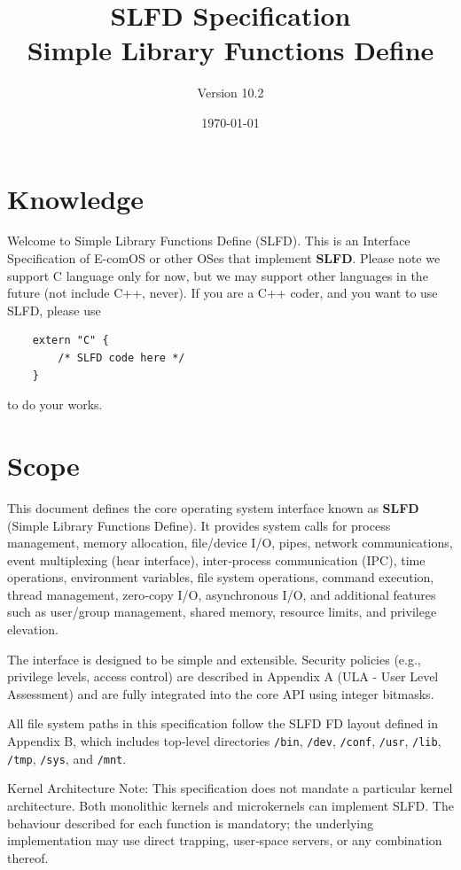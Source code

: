 \documentclass[12pt,a4paper]{article}
\title{SLFD Specification\\\large{Simple Library Functions Define}}
\author{Version 10.2}
\date{\today}
\begin{document}
\maketitle


\section{Knowledge}
Welcome to Simple Library Functions Define (SLFD). 
This is an Interface Specification of E-comOS or other OSes that implement \textbf{SLFD}.
Please note we support C language only for now, but we may support other languages in the future (not include C++, never).
If you are a C++ coder, and you want to use SLFD, please use 
\begin{lstlisting}
    extern "C" {
        /* SLFD code here */
    }
\end{lstlisting}
to do your works.

\section{Scope}
This document defines the core operating system interface known as \textbf{SLFD} (Simple Library Functions Define). It provides system calls for process management, memory allocation, file/device I/O, pipes, network communications, event multiplexing (hear interface), inter‑process communication (IPC), time operations, environment variables, file system operations, command execution, thread management, zero‑copy I/O, asynchronous I/O, and additional features such as user/group management, shared memory, resource limits, and privilege elevation.

The interface is designed to be simple and extensible. Security policies (e.g., privilege levels, access control) are described in Appendix A (ULA - User Level Assessment) and are fully integrated into the core API using integer bitmasks.

All file system paths in this specification follow the SLFD FD layout defined in Appendix B, which includes top‑level directories \texttt{/bin}, \texttt{/dev}, \texttt{/conf}, \texttt{/usr}, \texttt{/lib}, \texttt{/tmp}, \texttt{/sys}, and \texttt{/mnt}.

Kernel Architecture Note: This specification does not mandate a particular kernel architecture. Both monolithic kernels and microkernels can implement SLFD. The behaviour described for each function is mandatory; the underlying implementation may use direct trapping, user‑space servers, or any combination thereof.
\end{document}
